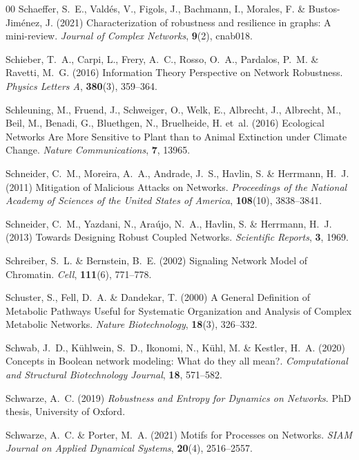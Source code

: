 \documentclass{comnet-mod}
\begin{document}
\begin{thebibliography}{00}
Schaeffer, S.~E., Vald\'es, V., Figols, J., Bachmann, I., Morales, F. {\&}
  Bustos-Jim\'enez, J. (2021)  {Characterization of robustness and resilience
  in graphs: A mini-review}. {\em {Journal of Complex Networks}},
  \textbf{9}(2), cnab018.

Schieber, T.~A., Carpi, L., Frery, A.~C., Rosso, O.~A., Pardalos, P.~M. {\&}
  Ravetti, M.~G. (2016)  {Information Theory Perspective on Network
  Robustness}. {\em {Physics Letters A}}, \textbf{380}(3), 359--364.

Schleuning, M., Fruend, J., Schweiger, O., Welk, E., Albrecht, J., Albrecht,
  M., Beil, M., Benadi, G., Bluethgen, N., Bruelheide, H.  et~al. (2016)
  {Ecological Networks Are More Sensitive to Plant than to Animal Extinction
  under Climate Change}. {\em {Nature Communications}}, \textbf{7}, 13965.

Schneider, C.~M., Moreira, A.~A., Andrade, J.~S., Havlin, S. {\&} Herrmann,
  H.~J. (2011)  {Mitigation of Malicious Attacks on Networks}. {\em
  {Proceedings of the National Academy of Sciences of the United States of
  America}}, \textbf{108}(10), 3838--3841.

Schneider, C.~M., Yazdani, N., Ara{\'u}jo, N.~A., Havlin, S. {\&} Herrmann,
  H.~J. (2013)  {Towards Designing Robust Coupled Networks}. {\em {Scientific
  Reports}}, \textbf{3}, 1969.

Schreiber, S.~L. {\&} Bernstein, B.~E. (2002)  {Signaling Network Model of
  Chromatin}. {\em {Cell}}, \textbf{111}(6), 771--778.

Schuster, S., Fell, D.~A. {\&} Dandekar, T. (2000)  {A General Definition of
  Metabolic Pathways Useful for Systematic Organization and Analysis of Complex
  Metabolic Networks}. {\em {Nature Biotechnology}}, \textbf{18}(3), 326--332.

Schwab, J.~D., K{\"u}hlwein, S.~D., Ikonomi, N., K{\"u}hl, M. {\&} Kestler,
  H.~A. (2020)  Concepts in Boolean network modeling: {W}hat do they all mean?.
  {\em {Computational and Structural Biotechnology Journal}}, \textbf{18},
  571--582.

Schwarze, A.~C. (2019) {\em {Robustness and Entropy for Dynamics on Networks}}.
PhD thesis, {University of Oxford}.

Schwarze, A.~C. {\&} Porter, M.~A. (2021)  {Motifs for {{Processes}} on
  {{Networks}}}. {\em {SIAM Journal on Applied Dynamical Systems}},
  \textbf{20}(4), 2516--2557.


\end{thebibliography}
\end{document}
